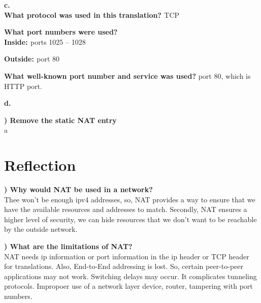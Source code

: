 \documentclass{report}
\newcommand{\mysection}[1]{\section*{#1}}
\newcommand{\mysubsection}[2]{\textbf{\romannumeral #1) #2}}
\begin{document}
{\bf{c.}}\\
{\bf{What protocol was used in this translation? }} TCP


{\bf{What port numbers were used?}}\\
{\bf{Inside: }} ports 1025 -- 1028


{\bf{Outside: }} port 80


{\bf{What well-known port number and service was used?}} port 80, which is HTTP
port.


{\bf{d.}}

\noindent\mysubsection{7}{Remove the static NAT entry}\\
a


\mysection{\textbf{Reflection}}

\mysubsection{1}{Why would NAT be used in a network?}\\
Thee won't be enough ipv4 addresses, so, NAT provides a way to ensure that we
have the available resources and addresses to match. Secondly, NAT ensures a
higher level of security, we can hide resources that we don't want to be
reachable by the outside network.

\noindent\mysubsection{2}{What are the limitations of NAT?}\\
NAT needs ip information or port information in the ip header or TCP header for translations.
Also, End-to-End addressing is lost. So, certain peer-to-peer applications may
not work. Switching delays may occur. It complicates
tunneling protocols. Impropoer use of a network layer device, router, tampering
with port numbers.
  
\end{document}
